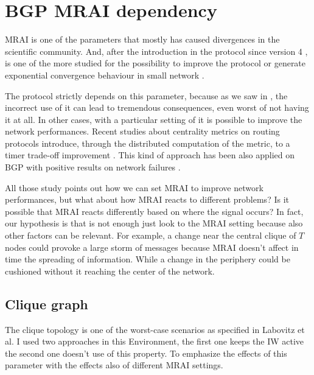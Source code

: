 \chapter{BGP MRAI dependency}
\label{cha:bgp_mrai_experiments}

\ac{MRAI} is one of the parameters that mostly has caused divergences in the 
scientific community.
And, after the introduction in the protocol since version 4 \cite{rfc4271}
, is one of the more studied for the possibility
to improve the protocol or generate exponential convergence behaviour in small
network \cite{fabrikant2011there}.

The protocol strictly depends on this parameter, because as we saw in ,
the incorrect use of it can lead to tremendous consequences, even worst of not
having it at all.
In other cases, with a particular setting of it is possible to improve the network
performances.
Recent studies about centrality metrics on routing protocols introduce, through 
the distributed computation of the metric, to a 
timer trade-off improvement \cite{MaLo18_ToN,GhiMa18_infocom}.
This kind of approach has been also applied on \ac{BGP} with positive results on
network failures \cite{milani2019BGP,milani2020improving}.

All those study points out how we can set \ac{MRAI} to improve network
performances, but what about how \ac{MRAI} reacts to different problems?
Is it possible that \ac{MRAI} reacts differently based on where the signal
occurs?
In fact, our hypothesis is that is not enough just look to the \ac{MRAI} setting
because also other factors can be relevant.
For example, a change near the central clique of $T$ nodes could provoke a large
storm of messages because \ac{MRAI} doesn't affect in time the spreading of information.
While a change in the periphery could be cushioned without it reaching the center
of the network.

\section{Clique graph}
\label{sec:bgp_mrai_clique}

The clique topology is one of the worst-case scenarios as specified in Labovitz et al.
\cite{labovitz2000delayed}
I used two approaches in this Environment, the first one keeps the \ac{IW} active
the second one doesn't use of this property.
To emphasize the effects of this parameter with the effects also of different 
\ac{MRAI} settings.

